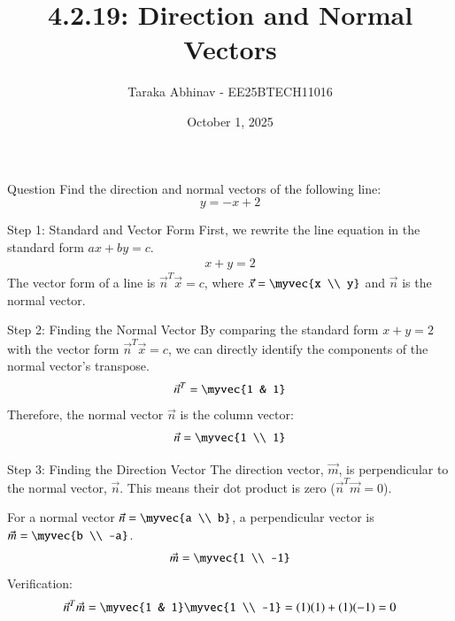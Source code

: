 \documentclass{beamer}
\begin{document}
\title 
{4.2.19: Direction and Normal Vectors}
\date{October 1, 2025}

\author 
{Taraka Abhinav - EE25BTECH11016}

\frame{\titlepage}

\begin{frame}{Question}
Find the direction and normal vectors of the following line:
\[ y = -x + 2 \]
\end{frame}

\begin{frame}{Step 1: Standard and Vector Form}
First, we rewrite the line equation in the standard form $ax + by = c$.
\begin{align}
    x + y = 2
\end{align}
The vector form of a line is $\vec{n}^T\vec{x} = c$, where $\vec{x} = \myvec{x \\ y}$ and $\vec{n}$ is the normal vector.
\end{frame}

\begin{frame}{Step 2: Finding the Normal Vector}
By comparing the standard form $x + y = 2$ with the vector form $\vec{n}^T\vec{x} = c$, we can directly identify the components of the normal vector's transpose.
\begin{align}
    \vec{n}^T = \myvec{1 & 1}
\end{align}
Therefore, the normal vector $\vec{n}$ is the column vector:
\begin{align}
    \vec{n} = \myvec{1 \\ 1}
\end{align}
\end{frame}

\begin{frame}{Step 3: Finding the Direction Vector}
The direction vector, $\vec{m}$, is perpendicular to the normal vector, $\vec{n}$. This means their dot product is zero ($\vec{n}^T\vec{m} = 0$).

For a normal vector $\vec{n} = \myvec{a \\ b}$, a perpendicular vector is $\vec{m} = \myvec{b \\ -a}$.
\begin{align}
    \vec{m} = \myvec{1 \\ -1}
\end{align}
Verification:
\begin{align}
    \vec{n}^T\vec{m} = \myvec{1 & 1}\myvec{1 \\ -1} = (1)(1) + (1)(-1) = 0
\end{align}
\end{frame}
\end{document}
